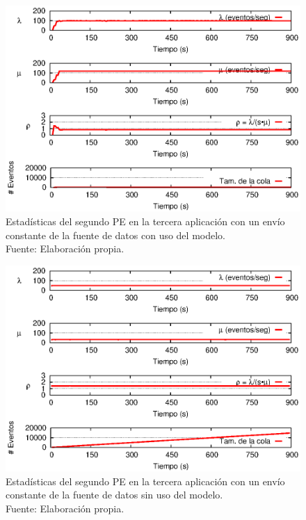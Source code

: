 \begin{figure}[!htp]
    \centering
    \captionsetup{justification=centering}
	\includegraphics[scale=1]{images/exp/app3/cm/logical/statusTwoPE.eps}
    \caption[Estad\'isticas del segundo PE en la tercera aplicaci\'on con un env\'io constante de la fuente de datos con uso del modelo.]{Estad\'isticas del segundo PE en la tercera aplicaci\'on con un env\'io constante de la fuente de datos con uso del modelo.\\Fuente: Elaboraci\'on propia.}
    \label{fig:app3-statusTwoPE-cm}
\end{figure}

\begin{figure}[!htp]
    \centering
    \captionsetup{justification=centering}
    \includegraphics[scale=1]{images/exp/app3/sm/logical/statusTwoPE.eps}
    \caption[Estad\'isticas del segundo PE en la tercera aplicaci\'on con un env\'io constante de la fuente de datos sin uso del modelo.]{Estad\'isticas del segundo PE en la tercera aplicaci\'on con un env\'io constante de la fuente de datos sin uso del modelo.\\Fuente: Elaboraci\'on propia.}
    \label{fig:app3-statusTwoPE-sm}
\end{figure}

